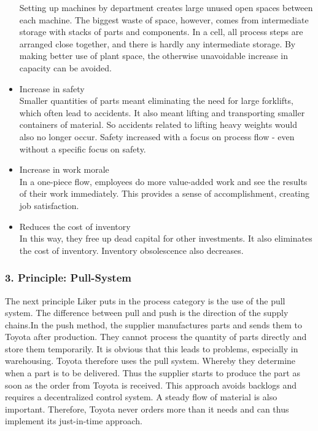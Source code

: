\documentclass[a4paper,12pt]{scrartcl}
\begin{document}
\begin{itemize}
    Setting up machines by department creates large unused open spaces between each machine. The biggest waste of space, however, comes from intermediate storage with stacks of parts and components. In a cell, all process steps are arranged close together, and there is hardly any intermediate storage. By making better use of plant space, the otherwise unavoidable increase in capacity can be avoided.
    \item Increase in safety\\
    Smaller quantities of parts meant eliminating the need for large forklifts, which often lead to accidents. It also meant lifting and transporting smaller containers of material. So accidents related to lifting heavy weights would also no longer occur. Safety increased with a focus on process flow - even without a specific focus on safety.
    \item Increase in work morale\\
    In a one-piece flow, employees do more value-added work and see the results of their work immediately. This provides a sense of accomplishment, creating job satisfaction.
    \item Reduces the cost of inventory\\
    In this way, they free up dead capital for other investments. It also eliminates the cost of inventory. Inventory obsolescence also decreases.
\end{itemize}

\clearpage

\subsubsection{3. Principle: Pull-System}

The next principle Liker puts in the process category is the use of the pull system. The difference between pull and push is the direction of the supply chains.In the push method, the supplier manufactures parts and sends them to Toyota after production. They cannot process the quantity of parts directly and store them temporarily. It is obvious that this leads to problems, especially in warehousing. Toyota therefore uses the pull system. Whereby they determine when a part is to be delivered. Thus the supplier starts to produce the part as soon as the order from Toyota is received. This approach avoids backlogs and requires a decentralized control system. A steady flow of material is also important. Therefore, Toyota never orders more than it needs and can thus implement its just-in-time approach. 
\end{document}
